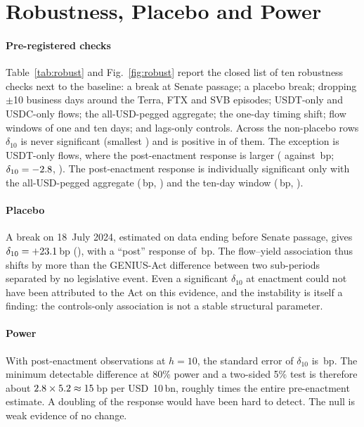 \section{Robustness, Placebo and Power}\label{sec:robustness}

\paragraph*{Pre-registered checks} Table~\ref{tab:robust} and Fig.~\ref{fig:robust} report the closed list of ten robustness checks next to the baseline: a break at Senate passage; a placebo break; dropping $\pm$10 business days around the Terra, FTX and SVB episodes; USDT-only and USDC-only flows; the all-USD-pegged aggregate; the one-day timing shift; flow windows of one and ten days; and lags-only controls. Across the \rbN{} non-placebo rows $\delta_{10}$ is never significant (smallest \rbMinP{}) and is positive in \rbNPos{} of them. The exception is USDT-only flows, where the post-enactment response is larger (\rbUSDTPost{} against \rbUSDTPre{}\,bp; $\delta_{10}=-2.8{}$, \rbUSDTDiffP{}). The post-enactment response is individually significant only with the all-USD-pegged aggregate (\rbAllPost{}\,bp, \rbAllPostP{}) and the ten-day window (\rbKtenPost{}\,bp, \rbKtenPostP{}).

\paragraph*{Placebo} A break on 18~July 2024, estimated on data ending before Senate passage, gives $\delta_{10}=+23.1{}$\,bp (\rbPlDiffP{}), with a ``post'' response of \rbPlPost{}\,bp. The flow--yield association thus shifts by more than the GENIUS-Act difference between two sub-periods separated by no legislative event. Even a significant $\delta_{10}$ at enactment could not have been attributed to the Act on this evidence, and the instability is itself a finding: the controls-only association is not a stable structural parameter.

\paragraph*{Power} With \nPostTen{} post-enactment observations at $h=10$, the standard error of $\delta_{10}$ is \bDiffSE{}\,bp. The minimum detectable difference at 80\% power and a two-sided 5\% test is therefore about $2.8\times5.2{}\approx15{}$\,bp per USD~10\,bn, roughly \mdeRatio{} times the entire pre-enactment estimate. A doubling of the response would have been hard to detect. The null is weak evidence of no change.

